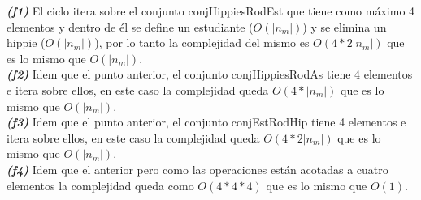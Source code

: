 \textit{\textbf{(f1)}} El ciclo itera sobre el conjunto conjHippiesRodEst que tiene como máximo 4 elementos y dentro de él se define un estudiante ($O(|n_m|)$) y se elimina un hippie ($O(|n_m|)$), por lo tanto la complejidad del mismo es $O(4*2|n_m|)$ que es lo mismo que $O(|n_m|)$. \\
\textit{\textbf{(f2)}} Idem que el punto anterior, el conjunto conjHippiesRodAs tiene 4 elementos e itera sobre ellos, en este caso la complejidad queda $O(4*|n_m|)$ que es lo mismo que  $O(|n_m|)$. \\
\textit{\textbf{(f3)}} Idem que el punto anterior, el conjunto conjEstRodHip tiene 4 elementos e itera sobre ellos, en este caso la complejidad queda $O(4*2|n_m|)$ que es lo mismo que  $O(|n_m|)$. \\
\textit{\textbf{(f4)}} Idem que el anterior pero como las operaciones están acotadas a cuatro elementos la complejidad queda como $O(4*4*4)$ que es lo mismo que $O(1)$.

~


